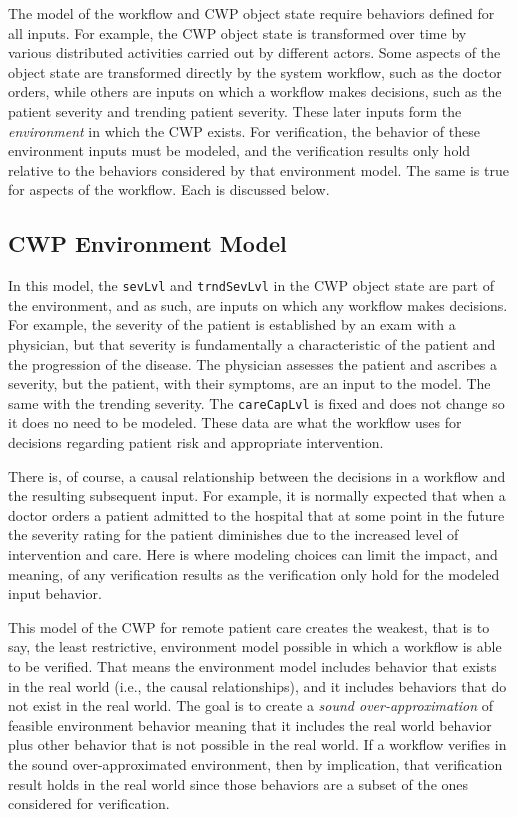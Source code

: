 The model of the workflow and CWP object state require behaviors defined for all inputs. For example, the CWP object state is transformed over time by various distributed activities carried out by different actors. Some aspects of the object state are transformed directly by the system workflow, such as the doctor orders, while others are inputs on which a workflow makes decisions, such as the patient severity and trending patient severity. These later inputs form the \emph{environment} in which the CWP exists. For verification, the behavior of these environment inputs must be modeled, and the verification results only hold relative to the behaviors considered by that environment model. The same is true for aspects of the workflow. Each is discussed below.

\subsection{CWP Environment Model}
In this model, the \texttt{sevLvl} and \texttt{trndSevLvl} in the CWP object state are part of the environment, and as such, are inputs on which any workflow makes decisions. For example, the severity of the patient is established by an exam with a physician, but that severity is fundamentally a characteristic of the patient and the progression of the disease. The physician assesses the patient and ascribes a severity, but the patient, with their symptoms, are an input to the model. The same with the trending severity. The \texttt{careCapLvl} is fixed and does not change so it does no need to be modeled. These data are what the workflow uses for decisions regarding patient risk and appropriate intervention. 

There is, of course, a causal relationship between the decisions in a workflow and the resulting subsequent input. For example, it is normally expected that when a doctor orders a patient admitted to the hospital that at some point in the future the severity rating for the patient diminishes due to the increased level of intervention and care. Here is where modeling choices can limit the impact, and meaning, of any verification results as the verification only hold for the modeled input behavior.

This model of the CWP for remote patient care creates the weakest, that is to say, the least restrictive, environment model possible in which a workflow is able to be verified. That means the environment model includes behavior that exists in the real world (i.e., the causal relationships), and it includes behaviors that do not exist in the real world. The goal is to create a \emph{sound over-approximation} of feasible environment behavior meaning that it includes the real world behavior plus other behavior that is not possible in the real world. If a workflow verifies in the sound over-approximated environment, then by implication, that verification result holds in the real world since those behaviors are a subset of the ones considered for verification. 

